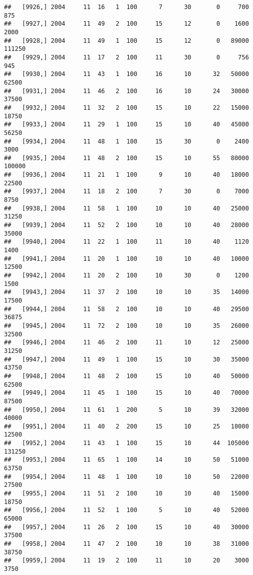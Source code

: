 \documentclass{article}\usepackage[]{graphicx}\usepackage[]{color}
\makeatletter
\newenvironment{kframe}{%
 \def\at@end@of@kframe{}%
 \ifinner\ifhmode%
  \def\at@end@of@kframe{\end{minipage}}%
  \begin{minipage}{\columnwidth}%
 \fi\fi%
 \def\FrameCommand##1{\hskip\@totalleftmargin \hskip-\fboxsep
 \colorbox{shadecolor}{##1}\hskip-\fboxsep
     \hskip-\linewidth \hskip-\@totalleftmargin \hskip\columnwidth}%
 \MakeFramed {\advance\hsize-\width
   \@totalleftmargin\z@ \linewidth\hsize
   \@setminipage}}%
 {\par\unskip\endMakeFramed%
 \at@end@of@kframe}
\newenvironment{knitrout}{}{} %
\makeatother
\begin{document}
\begin{knitrout}
\begin{kframe}
\begin{verbatim}
##   [9926,] 2004     11  16   1  100      7      30       0     700     875
##   [9927,] 2004     11  49   2  100     15      12       0    1600    2000
##   [9928,] 2004     11  49   1  100     15      12       0   89000  111250
##   [9929,] 2004     11  17   2  100     11      30       0     756     945
##   [9930,] 2004     11  43   1  100     16      10      32   50000   62500
##   [9931,] 2004     11  46   2  100     16      10      24   30000   37500
##   [9932,] 2004     11  32   2  100     15      10      22   15000   18750
##   [9933,] 2004     11  29   1  100     15      10      40   45000   56250
##   [9934,] 2004     11  48   1  100     15      30       0    2400    3000
##   [9935,] 2004     11  48   2  100     15      10      55   80000  100000
##   [9936,] 2004     11  21   1  100      9      10      40   18000   22500
##   [9937,] 2004     11  18   2  100      7      30       0    7000    8750
##   [9938,] 2004     11  58   1  100     10      10      40   25000   31250
##   [9939,] 2004     11  52   2  100     10      10      40   28000   35000
##   [9940,] 2004     11  22   1  100     11      10      40    1120    1400
##   [9941,] 2004     11  20   1  100     10      10      40   10000   12500
##   [9942,] 2004     11  20   2  100     10      30       0    1200    1500
##   [9943,] 2004     11  37   2  100     10      10      35   14000   17500
##   [9944,] 2004     11  58   2  100     10      10      40   29500   36875
##   [9945,] 2004     11  72   2  100     10      10      35   26000   32500
##   [9946,] 2004     11  46   2  100     11      10      12   25000   31250
##   [9947,] 2004     11  49   1  100     15      10      30   35000   43750
##   [9948,] 2004     11  48   2  100     15      10      40   50000   62500
##   [9949,] 2004     11  45   1  100     15      10      40   70000   87500
##   [9950,] 2004     11  61   1  200      5      10      39   32000   40000
##   [9951,] 2004     11  40   2  200     15      10      25   10000   12500
##   [9952,] 2004     11  43   1  100     15      10      44  105000  131250
##   [9953,] 2004     11  65   1  100     14      10      50   51000   63750
##   [9954,] 2004     11  48   1  100     10      10      50   22000   27500
##   [9955,] 2004     11  51   2  100     10      10      40   15000   18750
##   [9956,] 2004     11  52   1  100      5      10      40   52000   65000
##   [9957,] 2004     11  26   2  100     15      10      40   30000   37500
##   [9958,] 2004     11  47   2  100     10      10      38   31000   38750
##   [9959,] 2004     11  19   2  100     11      10      20    3000    3750

\end{verbatim}
\end{kframe}
\end{knitrout}
\end{document}
